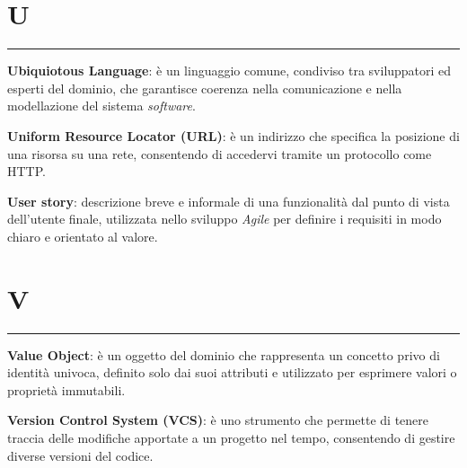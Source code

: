 \section*{U}
{\color{lightgray}\rule{\textwidth}{0.4pt}} %
\begin{glossaryitemize}
    \item \textbf{Ubiquiotous Language}: è un linguaggio comune, condiviso tra sviluppatori ed esperti del dominio, che garantisce coerenza nella comunicazione e nella modellazione del sistema \textit{software}.
    \item \textbf{Uniform Resource Locator (URL)}: è un indirizzo che specifica la posizione di una risorsa su una rete, consentendo di accedervi tramite un protocollo come HTTP.
    \item \textbf{User story}: descrizione breve e informale di una funzionalità dal punto di vista dell'utente finale, utilizzata nello sviluppo \textit{Agile} per definire i requisiti in modo chiaro e orientato al valore.
\end{glossaryitemize}

\section*{V}
{\color{lightgray}\rule{\textwidth}{0.4pt}} %
\begin{glossaryitemize}
    \item \textbf{Value Object}: è un oggetto del dominio che rappresenta un concetto privo di identità univoca, definito solo dai suoi attributi e utilizzato per esprimere valori o proprietà immutabili.
    \item \textbf{Version Control System (VCS)}: è uno strumento che permette di tenere traccia delle modifiche apportate a un progetto nel tempo, consentendo di gestire diverse versioni del codice.
\end{glossaryitemize}



